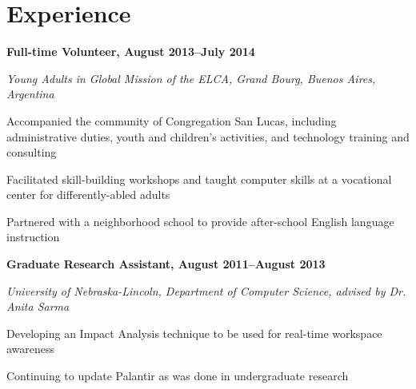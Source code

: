 \documentclass[10pt,letterpaper]{article}
\renewenvironment{itemize}{
  \begin{list}{}{
    \setlength{\leftmargin}{1.5em}
    \setlength{\itemsep}{0.25em}
    \setlength{\parskip}{0pt}
    \setlength{\parsep}{0.25em}
  }
}{
  \end{list}
}
\begin{document}






\section*{Experience}

\begin{itemize}
\item \textbf{Full-time Volunteer, August 2013--July 2014}
\item \emph{Young Adults in Global Mission of the ELCA, Grand Bourg, Buenos Aires, Argentina}
	\begin{itemize}
    \item Accompanied the community of Congregation San Lucas, including
    administrative duties, youth and children's activities, and technology
    training and consulting
    \item Facilitated skill-building workshops and taught computer skills at
    a vocational center for differently-abled adults
    \item Partnered with a neighborhood school to provide after-school
    English language instruction
	\end{itemize}
\end{itemize}

\begin{itemize}
\item \textbf{Graduate Research Assistant, August 2011--August 2013}
\item \emph{University of Nebraska-Lincoln, Department of Computer Science, advised by Dr. Anita Sarma}
	\begin{itemize}
	\item Developing an Impact Analysis technique to be used for real-time workspace awareness
	\item Continuing to update Palantir as was done in undergraduate research
	\end{itemize}
\end{itemize}

\begin{comment}
\begin{itemize}
\item \textbf{Host and Fellowship Coordinator, August 2012--July 2013}
\item \emph{Lutheran Student Center (ELCA), University of Nebraska-Lincoln}
    \begin{itemize}
    \item Clean and maintain the Lutheran Student Center building
    \item Engage students with fun fellowship opportunities such as movie nights and pool leagues
    \end{itemize}
\end{itemize}
\end{comment}
\end{document}
